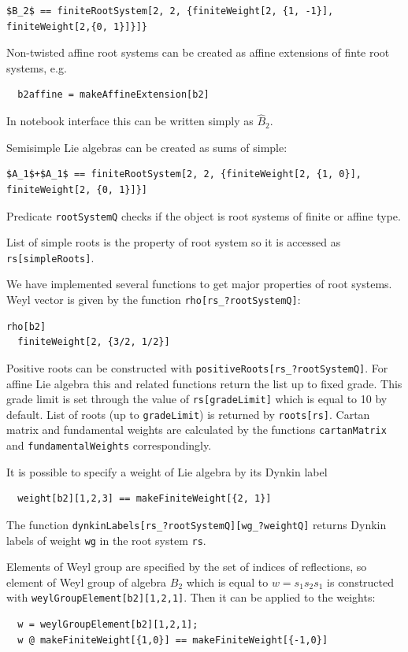 \documentclass[preprint,12pt]{elsarticle}
\begin{document}
\begin{lstlisting}[mathescape=true]
  $B_2$ == finiteRootSystem[2, 2, {finiteWeight[2, {1, -1}], finiteWeight[2,{0, 1}]}]}
\end{lstlisting}

Non-twisted affine root systems can be created as affine extensions of finte root systems, e.g.
\begin{lstlisting}
  b2affine = makeAffineExtension[b2]
\end{lstlisting}
In notebook interface this can be written simply as $\hat{B}_2$. 

Semisimple Lie algebras can be created as sums of simple:
\begin{lstlisting}[mathescape=true]
  $A_1$+$A_1$ == finiteRootSystem[2, 2, {finiteWeight[2, {1, 0}], finiteWeight[2, {0, 1}]}]
\end{lstlisting}

Predicate \lstinline{rootSystemQ} checks if the object is root systems of finite or affine type. 

List of simple roots is the property of root system so it is accessed as \lstinline{rs[simpleRoots]}. 

We have implemented several functions to get major properties of root systems. Weyl vector is given by the function \lstinline{rho[rs_?rootSystemQ]}:
\begin{lstlisting}[label=list:1]
  rho[b2]
  finiteWeight[2, {3/2, 1/2}]
\end{lstlisting}
Positive roots can be constructed with \lstinline{positiveRoots[rs_?rootSystemQ]}. For affine Lie algebra this and related functions return the list up to fixed grade. This grade limit is set through the value of \lstinline{rs[gradeLimit]} which is equal to 10 by default. List of roots (up to \lstinline{gradeLimit}) is returned by \lstinline{roots[rs]}. Cartan matrix and fundamental weights are calculated by the functions \lstinline{cartanMatrix} and \lstinline{fundamentalWeights} correspondingly. 

It is possible to specify a weight of Lie algebra by its Dynkin label
\begin{lstlisting}
  weight[b2][1,2,3] == makeFiniteWeight[{2, 1}]
\end{lstlisting}
The function \lstinline{dynkinLabels[rs_?rootSystemQ][wg_?weightQ]} returns Dynkin labels of weight \lstinline{wg} in the root system \lstinline{rs}.

Elements of Weyl group are specified by the set of indices of reflections, so element of Weyl group of algebra $B_{2}$ which is equal to $w=s_{1}s_{2}s_{1}$ is constructed with \lstinline{weylGroupElement[b2][1,2,1]}. Then it can be applied to the weights:
\begin{lstlisting}
  w = weylGroupElement[b2][1,2,1];
  w @ makeFiniteWeight[{1,0}] == makeFiniteWeight[{-1,0}]
\end{lstlisting}
\end{document}
